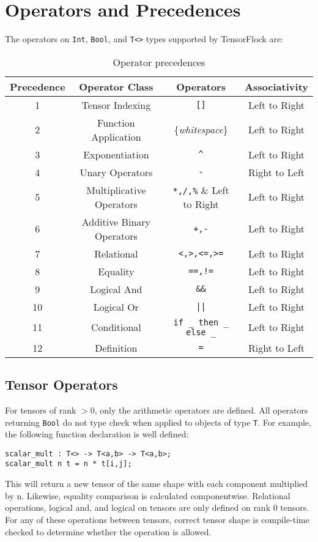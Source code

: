 \section{Operators and Precedences}%
\label{sec:operators_and_precedences}

The operators on \verb|Int|, \verb|Bool|, and \verb|T<>| types
supported by TensorFlock are:

\begin{table}[htpb]
    \centering
    \caption{Operator precedences}
    \label{tab:label}
\begin{tabular}{ |c|c|c|c| } 
 \hline
 Precedence & Operator Class & Operators & Associativity\\ 
 \hline
 1 & Tensor Indexing & \verb|[]| & Left to Right\\
 \hline
 2 & Function Application & \{\textit{whitespace}\} & Left to Right \\
 \hline
 3 & Exponentiation & \verb|^| & Left to Right\\
 \hline
 4 & Unary Operators & \verb|-| & Right to Left \\
 \hline
 5 & Multiplicative Operators & \verb|*,/,%| & Left to Right\\
 \hline
 6 & Additive Binary Operators & \verb|+,-| & Left to Right\\
 \hline
 7 & Relational & \verb|<,>,<=,>=| & Left to Right\\
 \hline
 8 & Equality & \verb|==,!=| & Left to Right\\
 \hline
 9 & Logical And & \verb|&&| & Left to Right\\
 \hline
 10 & Logical Or & \verb!||! & Left to Right\\
 \hline
 11 & Conditional & \verb!if _ then _ else _! & Left to Right\\
 \hline
 12 & Definition & \verb|=| & Right to Left\\
 \hline
\end{tabular}
    
\end{table}
\begin{center}
\end{center}

\subsection{Tensor Operators}
For tensors of rank $> 0$, only the arithmetic operators are defined. All
operators returning \verb|Bool| do not type check when applied to objects of
type \verb|T|.
For example, the following function declaration is well defined:
\begin{lstlisting}
scalar_mult : T<> -> T<a,b> -> T<a,b>;
scalar_mult n t = n * t[i,j];
\end{lstlisting}
This will return a new tensor of the same shape with each component multiplied
by n. Likewise, equality comparison is calculated componentwise. Relational
operations, logical and, and logical on tensors are only defined on rank
0 tensors.  For any of these operations between tensors, correct tensor shape is
compile-time checked to determine whether the operation is allowed.

